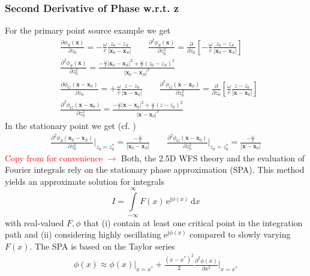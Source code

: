 \documentclass[a4paper,BCOR=15mm,10pt,twoside]{scrartcl}
\newcommand{\fscom}[2][red]{\textcolor{#1}{#2}}  %
\newcommand\e{\mathrm{e}}  %
\newcommand\im{\mathrm{j}}  %
\newcommand\fsd{\mathrm{d}}  %
\newcommand\wc{\frac{\omega}{c}}  %
\renewcommand{\vec}[1]{\mathbf{#1}}  %
\begin{document}
\subsubsection{Second Derivative of Phase w.r.t. z}
For the primary point source example we get
\begin{align}
&\frac{\partial \phi_{S}(\vec{x})}{\partial z_0} = - \wc \frac{z_0-z_S}{|\vec{x}_0-\vec{x}_S|}\qquad
\frac{\partial^2 \phi_{S}(\vec{x})}{\partial z_0^2} = \frac{\partial}{\partial z_0}[- \wc \frac{z_0-z_S}{|\vec{x}_0-\vec{x}_S|}]\\
&\frac{\partial^2 \phi_{S}(\vec{x})}{\partial z_0^2} = \frac{-\wc |\vec{x}_0-\vec{x}_S|^2 + \wc (z_0-z_S)^2}{|\vec{x}_0-\vec{x}_S|^3}\\
&\frac{\partial \phi_{G}(\vec{x}-\vec{x}_0)}{\partial z_0} = +\wc \frac{z-z_0}{|\vec{x}-\vec{x}_0|}\qquad
\frac{\partial^2 \phi_{G}(\vec{x}-\vec{x}_0)}{\partial z_0^2} = \frac{\partial}{\partial z_0}[\wc \frac{z-z_0}{|\vec{x}-\vec{x}_0|}]\\
&\frac{\partial^2 \phi_{G}(\vec{x}-\vec{x}_0)}{\partial z_0^2} = \frac{-\wc |\vec{x}-\vec{x}_0|^2 + \wc (z-z_0)^2}{|\vec{x}-\vec{x}_0|^3}
\end{align}
In the stationary point we get (cf. \cite[eq. (10)ff]{Firtha2018})
\begin{align}
\label{eq:phizz}
\frac{\partial^2 \phi_{S}(\vec{x}_0-\vec{x}_S)}{\partial z_0^2}\bigg|_{z_0=z_0^*} = \frac{-\wc}{|\vec{x}_0-\vec{x}_S|}\qquad
\frac{\partial^2 \phi_{G}(\vec{x}-\vec{x}_0)}{\partial z_0^2}\bigg|_{z_0=z_0^*} = \frac{-\wc}{|\vec{x}-\vec{x}_0|}
\end{align}
\fscom{Copy from \cite{Firtha2018} for convenience $\rightarrow$}
%
Both, the 2.5D WFS theory and the evaluation of Fourier integrals rely on the stationary phase approximation (SPA).
This method yields an approximate solution for integrals
\begin{equation}
\label{Eq:SPAintegral}
I = \int\limits_{-\infty}^{\infty} F(x) \, \e^{\im \phi(x)} \, \fsd x
\end{equation}
with real-valued $F,\phi$ that (i) contain at least one critical point in the integration path and (ii) considering highly oscillating $\e^{\im \phi(x)}$ compared to slowly varying $F(x)$. %
The SPA is based on the Taylor series
\begin{align}
\phi(x) \approx \phi(x)\big|_{x=x^*} + \frac{(x-x^*)^2}{2} \frac{\partial^2 \phi(x)}{\partial x^2}\big|_{x=x^*} 
\end{align} 
\end{document}
